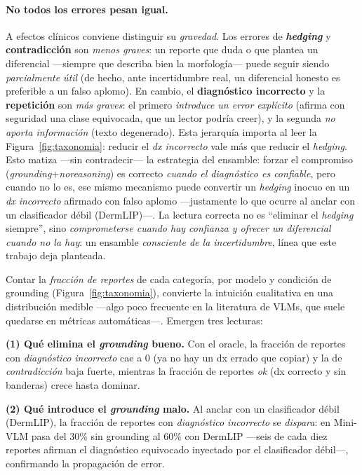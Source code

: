 \documentclass[11pt, a4paper]{article}
\begin{document}
\paragraph{No todos los errores pesan igual.} A efectos clínicos conviene distinguir su \emph{gravedad}.
Los errores de \textbf{\emph{hedging}} y \textbf{contradicción} son \emph{menos graves}: un reporte que
duda o que plantea un diferencial —siempre que describa bien la morfología— puede seguir siendo
\emph{parcialmente útil} (de hecho, ante incertidumbre real, un diferencial honesto es preferible a un
falso aplomo). En cambio, el \textbf{diagnóstico incorrecto} y la \textbf{repetición} son \emph{más
graves}: el primero \emph{introduce un error explícito} (afirma con seguridad una clase equivocada, que un
lector podría creer), y la segunda \emph{no aporta información} (texto degenerado). Esta jerarquía importa
al leer la Figura~\ref{fig:taxonomia}: reducir el \emph{dx incorrecto} vale más que reducir el
\emph{hedging}. Esto matiza —sin contradecir— la estrategia del ensamble: forzar el compromiso
(\emph{grounding}+\emph{noreasoning}) es correcto \emph{cuando el diagnóstico es confiable}, pero cuando no
lo es, ese mismo mecanismo puede convertir un \emph{hedging} inocuo en un \emph{dx incorrecto} afirmado con
falso aplomo —justamente lo que ocurre al anclar con un clasificador débil (DermLIP)—. La lectura correcta
no es ``eliminar el \emph{hedging} siempre'', sino \emph{comprometerse cuando hay confianza y ofrecer un
diferencial cuando no la hay}: un ensamble \emph{consciente de la incertidumbre}, línea que este trabajo
deja planteada.

Contar la \emph{fracción de reportes} de cada categoría, por modelo y condición de grounding
(Figura~\ref{fig:taxonomia}), convierte la intuición cualitativa en una distribución medible —algo poco
frecuente en la literatura de VLMs, que suele quedarse en métricas automáticas—. Emergen tres lecturas:

\textbf{(1) Qué elimina el \emph{grounding} bueno.} Con el oracle, la fracción de reportes con
\emph{diagnóstico incorrecto} cae a $0$ (ya no hay un dx errado que copiar) y la de \emph{contradicción}
baja fuerte, mientras la fracción de reportes \emph{ok} (dx correcto y sin banderas) crece hasta dominar.

\textbf{(2) Qué introduce el \emph{grounding} malo.} Al anclar con un clasificador débil (DermLIP), la
fracción de reportes con \emph{diagnóstico incorrecto} se \emph{dispara}: en Mini-VLM pasa del $30\%$ sin
grounding al $60\%$ con DermLIP —seis de cada diez reportes afirman el diagnóstico equivocado inyectado por el
clasificador débil—, confirmando la propagación de error.
\end{document}
